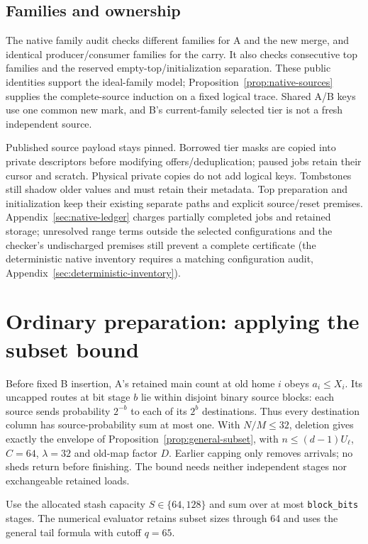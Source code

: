 \documentclass[11pt]{article}
\theoremstyle{definition}
\theoremstyle{remark}
\begin{document}
\subsection{Families and ownership}
The native family audit checks different families for A and the new merge,
and identical producer/consumer families for the carry. It also checks consecutive top families and the
reserved empty-top/initialization separation. These public identities
support the ideal-family model; Proposition~\ref{prop:native-sources}
supplies the complete-source induction on a fixed logical trace. Shared A/B keys use one common new
mark, and B's current-family selected tier is not a fresh independent source.

Published source payload stays pinned. Borrowed tier masks are copied into
private descriptors before modifying offers/deduplication; paused jobs
retain their cursor and scratch. Physical private copies do not add logical
keys. Tombstones still shadow older values and must retain their metadata.
Top preparation and initialization keep their existing separate paths and
explicit source/reset premises. Appendix~\ref{sec:native-ledger} charges partially completed jobs and
retained storage; unresolved range terms outside the selected
configurations and the checker's undischarged premises still prevent a
complete certificate (the deterministic native inventory requires a matching
configuration audit, Appendix~\ref{sec:deterministic-inventory}).

\section{Ordinary preparation: applying the subset bound}
\label{sec:preparation}
Before fixed B insertion, A's retained main count at
old home $i$ obeys $a_i\le X_i$. Its uncapped routes at bit stage $b$ lie
within disjoint binary source blocks: each source sends probability
$2^{-b}$ to each of its $2^b$ destinations. Thus every destination column
has source-probability sum at most one. With $N/M\le32$, deletion gives
exactly the envelope of Proposition~\ref{prop:general-subset}, with
$n\le(d-1)U_\ell$, $C=64$, $\lambda=32$ and old-map factor $D$.
Earlier capping only removes arrivals; no sheds return before finishing.
The bound needs neither independent stages nor exchangeable retained loads.

Use the allocated stash capacity $S\in\{64,128\}$ and sum over at most
\texttt{block\_bits} stages. The numerical evaluator retains subset sizes
through 64 and uses the general tail formula with cutoff $q=65$.
\end{document}
